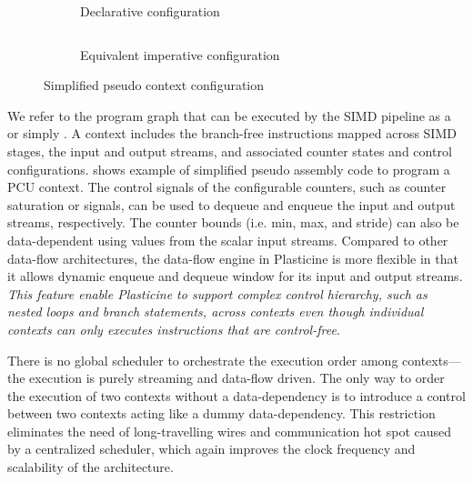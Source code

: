 \begin{figure}
  \begin{subfigure}[b]{0.5\textwidth}
    \inputminted{python}{code/contextfull.py}
    \caption{Declarative configuration}
    \label{fig:context}
  \end{subfigure}
  \hfill
  \begin{subfigure}[b]{0.4\textwidth}
    \inputminted{python}{code/context.py}
    \caption{Equivalent imperative configuration}
    \label{fig:context}
  \end{subfigure}
  \caption[Example context configuration]{Simplified pseudo context configuration}
\end{figure}

We refer to the program graph that can be executed by the SIMD pipeline as a  or
simply . 
A context includes the branch-free instructions mapped across SIMD stages, the input and output 
streams, and associated counter states and control configurations.
 shows example of simplified pseudo assembly code to program a PCU context.
The control signals of the configurable counters, such as counter saturation or 
signals, can be used to dequeue and enqueue the input and output streams, respectively.
The counter bounds (i.e. min, max, and stride) can also be data-dependent using values from the 
scalar input streams. Compared to other data-flow architectures, the data-flow engine in Plasticine 
is more flexible in that it allows dynamic enqueue and dequeue window for its input and output streams.
\emph{This feature enable Plasticine to support complex control hierarchy, such as nested loops and
branch statements, across contexts even though individual contexts can only executes instructions that are
control-free}. 

There is no global scheduler to orchestrate the execution order among contexts---the execution is purely
streaming and data-flow driven. 
The only way to order the execution of two contexts without a data-dependency is to 
introduce a control  between two contexts acting like a dummy data-dependency.
This restriction eliminates the need of long-travelling wires and communication hot spot caused by a
centralized scheduler, which  again improves the clock frequency and scalability of the architecture.

